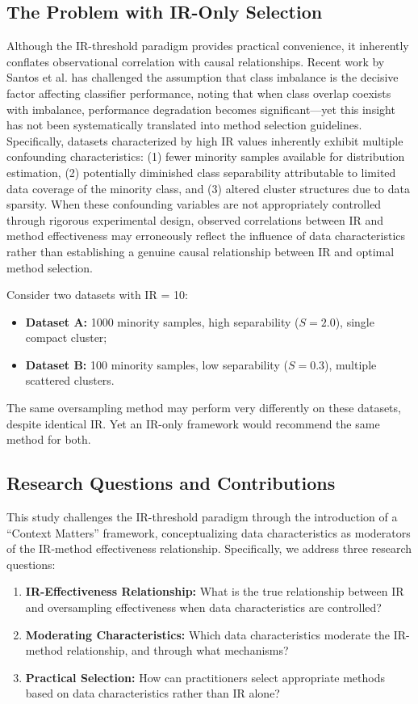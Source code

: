 \documentclass{ijSmartGrid}
\theoremstyle{definition}
\begin{document}
\subsection{The Problem with IR-Only Selection}
\indent Although the IR-threshold paradigm provides practical convenience, it inherently conflates observational correlation with causal relationships. Recent work by Santos et al. \cite{santos2023} has challenged the assumption that class imbalance is the decisive factor affecting classifier performance, noting that when class overlap coexists with imbalance, performance degradation becomes significant---yet this insight has not been systematically translated into method selection guidelines. Specifically, datasets characterized by high IR values inherently exhibit multiple confounding characteristics: (1) fewer minority samples available for distribution estimation, (2) potentially diminished class separability attributable to limited data coverage of the minority class, and (3) altered cluster structures due to data sparsity. When these confounding variables are not appropriately controlled through rigorous experimental design, observed correlations between IR and method effectiveness may erroneously reflect the influence of data characteristics rather than establishing a genuine causal relationship between IR and optimal method selection.

Consider two datasets with IR = 10:
\begin{itemize}
    \item \textbf{Dataset A:} 1000 minority samples, high separability ($S=2.0$), single compact cluster;
    \item \textbf{Dataset B:} 100 minority samples, low separability ($S=0.3$), multiple scattered clusters.
\end{itemize}
\indent The same oversampling method may perform very differently on these datasets, despite identical IR. Yet an IR-only framework would recommend the same method for both.

\subsection{Research Questions and Contributions}
\indent This study challenges the IR-threshold paradigm through the introduction of a ``Context Matters'' framework, conceptualizing data characteristics as moderators of the IR-method effectiveness relationship. Specifically, we address three research questions:

\begin{enumerate}
    \item[RQ1] \textbf{IR-Effectiveness Relationship:} What is the true relationship between IR and oversampling effectiveness when data characteristics are controlled?
    \item[RQ2] \textbf{Moderating Characteristics:} Which data characteristics moderate the IR-method relationship, and through what mechanisms?
    \item[RQ3] \textbf{Practical Selection:} How can practitioners select appropriate methods based on data characteristics rather than IR alone?
\end{enumerate}
\end{document}
